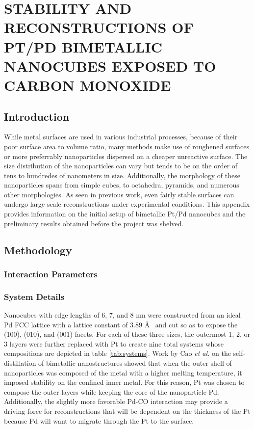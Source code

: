 
\chapter{STABILITY AND RECONSTRUCTIONS OF PT/PD BIMETALLIC NANOCUBES EXPOSED TO CARBON MONOXIDE}

\section{Introduction}

While metal surfaces are used in various industrial processes, because of their
poor surface area to volume ratio, many methods make use of roughened surfaces
or more preferrably nanoparticles dispersed on a cheaper unreactive surface. The size distribution of the
nanoparticles can vary but tends to be on the order of tens to hundredes of nanometers
in size. Additionally, the morphology of these nanoparticles spans from simple
cubes, to octahedra, pyramids, and numerous other morphologies.\citep{} As seen
in previous work\citep{Michalka:2013aa, Michalka:2015aa, Tao:2010aa}, even fairly stable surfaces can undergo
large scale reconstructions under experimental conditions. This appendix
provides information on the initial setup of bimetallic Pt/Pd nanocubes and the
preliminary results obtained before the project was shelved. 

\section{Methodology}

\subsection{Interaction Parameters}

\subsection{System Details}
Nanocubes with edge lengths of 6, 7, and 8 nm were constructed from an ideal Pd
FCC lattice with a lattice constant of 3.89 \AA~  and cut so as to expose the
(100), (010), and (001) facets. For each of these three sizes, the outermost 1,
2, or 3 layers were further replaced with Pt to create nine total systems whose compositions
are depicted in table \ref{tab:systems}. Work by Cao {\it et al.}\citep{Cao:2010gf} on the
self-distillation of bimetallic nanostructures showed that when the outer shell
of nanoparticles was composed of the metal with a higher melting temperature,
it imposed stability on the confined inner metal. For this reason, Pt was
chosen to compose the outer layers while keeping the core of the nanoparticle
Pd. Additionally, the slightly more favorable Pd-CO interaction may provide a
driving force for reconstructions that will be dependent on the thickness of
the Pt because Pd will want to migrate through the Pt to the surface.

